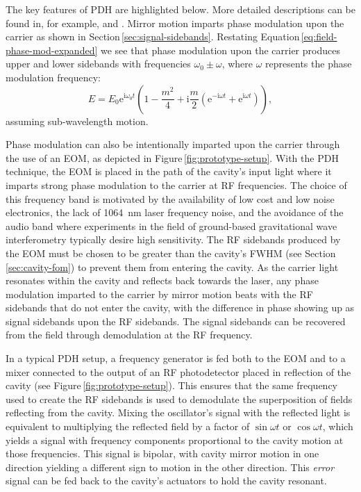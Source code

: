 The key features of \gls{PDH} are highlighted below. More detailed descriptions can be found in, for example, \cite{Freise2010} and \cite{Black2001}. Mirror motion imparts phase modulation upon the carrier as shown in Section\,\ref{sec:signal-sidebands}. Restating Equation\,\ref{eq:field-phase-mod-expanded} we see that phase modulation upon the carrier produces upper and lower sidebands with frequencies $\omega_0 \pm \omega$, where $\omega$ represents the phase modulation frequency:
\begin{equation}
  \label{eq:field-phase-mod-expanded-30}
  E = E_0 \text{e}^{\text{i} \omega_0 t} \left( 1 - \frac{m^2}{4} + \text{i} \frac{m}{2} \left( \text{e}^{-\text{i} \omega t} + \text{e}^{\text{i} \omega t} \right) \right),
\end{equation}
assuming sub-wavelength motion.

Phase modulation can also be intentionally imparted upon the carrier through the use of an \gls{EOM}, as depicted in Figure\,\ref{fig:prototype-setup}. With the \gls{PDH} technique, the \gls{EOM} is placed in the path of the cavity's input light where it imparts strong phase modulation to the carrier at \gls{RF} frequencies. The choice of this frequency band is motivated by the availability of low cost and low noise electronics, the lack of \SI{1064}{\nano\meter} laser frequency noise, and the avoidance of the audio band where experiments in the field of ground-based gravitational wave interferometry typically desire high sensitivity. The \gls{RF} sidebands produced by the \gls{EOM} must be chosen to be greater than the cavity's \gls{FWHM} (see Section\,\ref{sec:cavity-fom}) to prevent them from entering the cavity. As the carrier light resonates within the cavity and reflects back towards the laser, any phase modulation imparted to the carrier by mirror motion beats with the \gls{RF} sidebands that do not enter the cavity, with the difference in phase showing up as signal sidebands upon the \gls{RF} sidebands. The signal sidebands can be recovered from the field through demodulation at the \gls{RF} frequency.

In a typical \gls{PDH} setup, a frequency generator is fed both to the \gls{EOM} and to a mixer connected to the output of an \gls{RF} photodetector placed in reflection of the cavity (see Figure\,\ref{fig:prototype-setup}). This ensures that the same frequency used to create the \gls{RF} sidebands is used to demodulate the superposition of fields reflecting from the cavity. Mixing the oscillator's signal with the reflected light is equivalent to multiplying the reflected field by a factor of $\sin{\omega t}$ or $\cos{\omega t}$, which yields a signal with frequency components proportional to the cavity motion at those frequencies. This signal is bipolar, with cavity mirror motion in one direction yielding a different sign to motion in the other direction. This \emph{error} signal can be fed back to the cavity's actuators to hold the cavity resonant.

